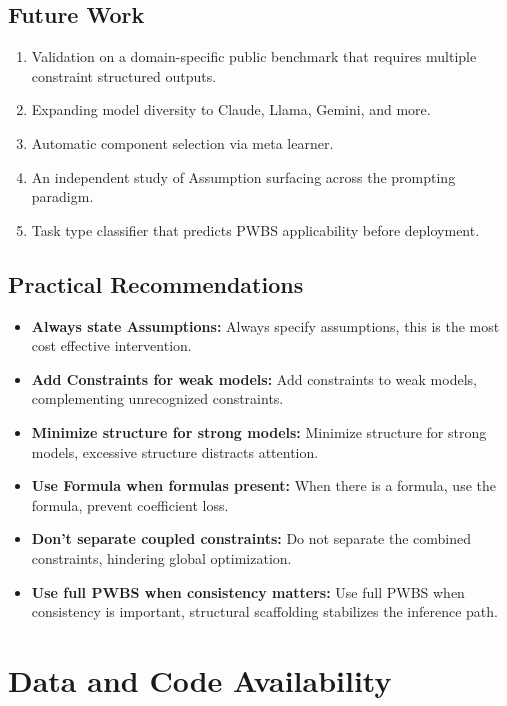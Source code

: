 \documentclass[11pt,a4paper]{article}
\begin{document}
\subsection{Future Work}

\begin{enumerate}[leftmargin=2em]
  \item Validation on a domain-specific public benchmark that requires multiple constraint structured outputs.
  \item Expanding model diversity to Claude, Llama, Gemini, and more.
  \item Automatic component selection via meta learner.
  \item An independent study of Assumption surfacing across the prompting paradigm.
  \item Task type classifier that predicts PWBS applicability before deployment.
\end{enumerate}

\subsection{Practical Recommendations}

\begin{itemize}[leftmargin=2em]
  \item \textbf{Always state Assumptions:} Always specify assumptions, this is the most cost effective intervention.
  \item \textbf{Add Constraints for weak models:} Add constraints to weak models, complementing unrecognized constraints.
  \item \textbf{Minimize structure for strong models:} Minimize structure for strong models, excessive structure distracts attention.
  \item \textbf{Use Formula when formulas present:} When there is a formula, use the formula, prevent coefficient loss.
  \item \textbf{Don't separate coupled constraints:} Do not separate the combined constraints, hindering global optimization.
  \item \textbf{Use full PWBS when consistency matters:} Use full PWBS when consistency is important, structural scaffolding stabilizes the inference path.
\end{itemize}

\section*{Data and Code Availability}
\end{document}
